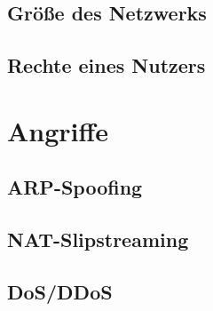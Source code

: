 \subsection{Größe des Netzwerks}
\subsection{Rechte eines Nutzers}

\section{Angriffe}
\subsection{ARP-Spoofing}
\subsection{NAT-Slipstreaming}
\subsection{DoS/DDoS}
\subsection{}